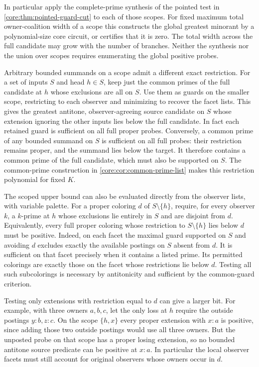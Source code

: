 In particular apply the complete-prime synthesis
of the pointed test in \cref{core:thm:pointed-guard-cut}
to each of those scopes. For fixed maximum total
owner-coalition width of a scope this constructs
the global greatest minorant by a polynomial-size
core circuit, or certifies that it is zero. The
total width across the full candidate may grow
with the number of branches. Neither the synthesis
nor the union over scopes requires enumerating
the global positive probes.

Arbitrary bounded summands on a scope admit a different exact
restriction. For a set of inputs $S$ and head $h\in S$, keep
just the common primes of the full candidate at $h$ whose
exclusions are all on $S$. Use them as guards on the smaller
scope, restricting to each observer and minimizing to recover
the facet lists. This gives the greatest antitone,
observer-agreeing source candidate on $S$ whose extension
ignoring the other inputs lies below the full candidate.
In fact each retained guard is sufficient on all full proper
probes. Conversely, a common prime of any bounded summand
on $S$ is sufficient on all full probes: their restriction
remains proper, and the summand lies below the target. It
therefore contains a common prime of the full candidate,
which must also be supported on $S$. The common-prime
construction in \cref{core:cor:common-prime-list} makes this
restriction polynomial for fixed $K$.

The scoped upper bound can also be evaluated directly from
the observer lists, with variable palette. For a proper
coloring $d$ of $S\setminus\{h\}$, require, for every
observer $k$, a $k$-prime at $h$ whose exclusions lie
entirely in $S$ and are disjoint from $d$.
Equivalently, every full proper coloring whose restriction
to $S\setminus\{h\}$ lies below $d$ must be positive.
Indeed, on each facet the maximal guard supported on $S$
and avoiding $d$ excludes exactly the available postings
on $S$ absent from $d$. It is sufficient on that facet
precisely when it contains a listed prime. Its permitted
colorings are exactly those on the facet whose restrictions
lie below $d$. Testing all such subcolorings is necessary
by antitonicity and sufficient by the common-guard criterion.

Testing only extensions with restriction equal to $d$
can give a larger bit. For example, with three owners
$a,b,c$, let the only loss at $h$ require the outside
postings $y:b,z:c$. On the scope $\{h,x\}$ every proper
extension with $x:a$ is positive, since adding those two
outside postings would use all three owners. But the
unposted probe on that scope has a proper losing
extension, so no bounded antitone source predicate
can be positive at $x:a$. In particular the local
observer facets must still account for original
observers whose owners occur in $d$.

